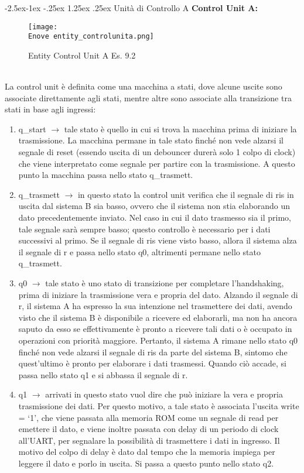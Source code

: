 \documentclass[12pt]{article}
\makeatletter
\renewcommand\paragraph{\@startsection{paragraph}{4}{\z@}%
            {-2.5ex\@plus -1ex \@minus -.25ex}%
            {1.25ex \@plus .25ex}%
            {\normalfont\large\bfseries}}
\def \Enove {Allegati/Esercizio9/}
\makeatother
\begin{document}
\paragraph{Unità di Controllo A}
{\large \textbf{Control Unit A:}}
\begin{figure}[ht]
    \centering
    \texttt{[image: \\Enove entity\_controlunita.png]}
    \caption{Entity Control Unit A Es. 9.2}
\end{figure}
\\La control unit è definita come una macchina a stati, dove alcune uscite sono associate direttamente agli stati, mentre altre sono associate alla transizione tra stati in base agli ingressi:
\begin{enumerate}
    \item q\_start $\rightarrow$ tale stato è quello in cui si trova la macchina prima di iniziare la trasmissione. La macchina permane in tale stato finché non vede alzarsi il segnale di reset (essendo uscita di un debouncer durerà solo 1 colpo di clock) che viene interpretato come segnale per partire con la trasmissione. A questo punto la macchina passa nello stato q\_trasmett.
    \item q\_trasmett $\rightarrow$ in questo stato la control unit verifica che il segnale di ris in uscita dal sistema B sia basso, ovvero che il sistema non stia elaborando un dato precedentemente inviato. Nel caso in cui il dato trasmesso sia il primo, tale segnale sarà sempre basso; questo controllo è necessario per i dati successivi al primo. Se il segnale di ris viene visto basso, allora il sistema alza il segnale di r e passa nello stato q0, altrimenti permane nello stato q\_trasmett.
    \item q0 $\rightarrow$ tale stato è uno stato di transizione per completare l’handshaking, prima di iniziare la trasmissione vera e propria del dato. Alzando il segnale di r, il sistema A ha espresso la sua intenzione nel trasmettere dei dati, avendo visto che il sistema B è disponibile a ricevere ed elaborarli, ma non ha ancora saputo da esso se effettivamente è pronto a ricevere tali dati o è occupato in operazioni con priorità maggiore. Pertanto, il sistema A rimane nello stato q0 finché non vede alzarsi il segnale di ris da parte del sistema B, sintomo che quest’ultimo è pronto per elaborare i dati trasmessi. Quando ciò accade, si passa nello stato q1 e si abbassa il segnale di r.
    \item q1 $\rightarrow$ arrivati in questo stato vuol dire che può iniziare la vera e propria trasmissione dei dati. Per questo motivo, a tale stato è associata l’uscita write = ‘1’, che viene passata alla memoria ROM come un segnale di read per emettere il dato, e viene inoltre passata con delay di un periodo di clock all’UART, per segnalare la possibilità di trasmettere i dati in ingresso. Il motivo del colpo di delay è dato dal tempo che la memoria impiega per leggere il dato e porlo in uscita. Si passa a questo punto nello stato q2.

\end{enumerate}
\end{document}

